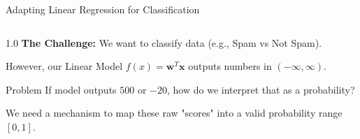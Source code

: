 
\begin{frame}{Adapting Linear Regression for Classification}
    \begin{columns}[c]
        \begin{column}{1.0\textwidth}
            \textbf{The Challenge:}
            We want to classify data (e.g., Spam vs Not Spam).
            
            \vspace{1em}
            However, our Linear Model $f(x) = \mathbf{w}^T\mathbf{x}$ outputs numbers in $(-\infty, \infty)$.
            
            \vspace{1em}
            \begin{exampleblock}{Problem}
                If model outputs $500$ or $-20$, how do we interpret that as a probability?
            \end{exampleblock}
            
            \vspace{1em}
            We need a mechanism to map these raw "scores" into a valid probability range $[0, 1]$.
        \end{column}
    \end{columns}
\end{frame}


